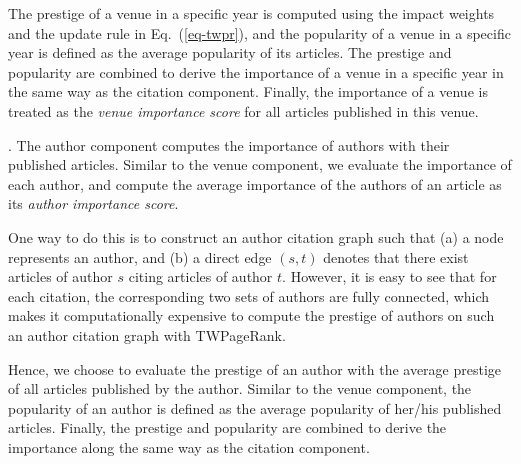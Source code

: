 The prestige of a venue in a specific year is computed using the impact weights and the update rule in Eq.~(\ref{eq-twpr}), and the popularity of a venue in a specific year is defined as the average popularity of its articles. The prestige and popularity are combined to derive the importance of a venue in a specific year in the same way as the citation component. Finally, the importance of a venue is treated as the {\em venue importance score} for all articles published in this venue.






.
The author component computes the importance of authors with their published articles.
%
Similar to the venue component, we evaluate the importance of each author, and compute the average importance of the authors of an article as its {\em author importance score}.

One way to do this is to construct an author citation graph  such that (a) a node represents an author, and (b) a direct edge $(s,t)$ denotes that there exist articles of author $s$ citing articles of author $t$. However, it is easy to see that for each citation, the corresponding two sets of authors are fully connected, which makes it computationally expensive to compute the prestige of authors on such an author citation graph with TWPageRank.

Hence, we choose to evaluate the prestige of an author with the average prestige of all articles published by the author. Similar to the venue component, the popularity of an author is  defined as the average popularity of her/his published articles. Finally, the prestige and popularity are combined to derive the importance along the same way as the citation component.





